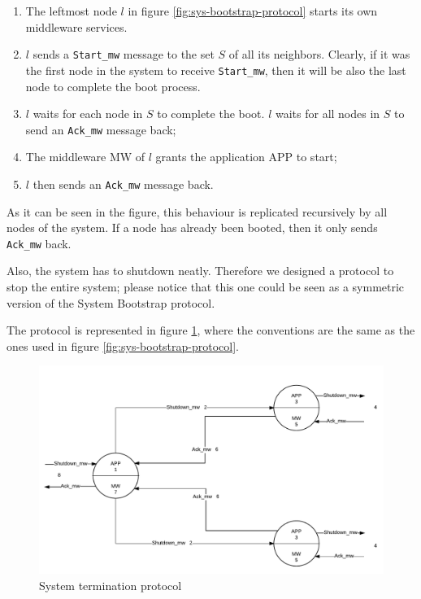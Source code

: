 \begin{enumerate}
  \item The leftmost node $l$ in figure \ref{fig:sys-bootstrap-protocol}
    starts its own middleware services.  
  \item $l$ sends a \texttt{Start\_mw} message to the set $S$ of all its
    neighbors. Clearly, if it was the first node in the system to receive
    \texttt{Start\_mw}, then it will be also the last node to complete the
    boot process.
  \item $l$ waits for each node in $S$ to complete the boot. $l$ waits for all
nodes in $S$ to send an \texttt{Ack\_mw} message back;
  \item The middleware MW of $l$ grants the application APP to start;
  \item $l$ then sends an \texttt{Ack\_mw} message back.
\end{enumerate}

As it can be seen in the figure, this behaviour is replicated recursively
by all nodes of the system. If a node has already been booted, then it only
sends \texttt{Ack\_mw} back.

Also, the system has to shutdown neatly. Therefore we designed a protocol to
stop the entire system; please notice that this one could be seen as a
symmetric version of the System Bootstrap protocol.

The protocol is represented in figure \ref{fig:sys-termination-protocol}, where
the conventions are the same as the ones used in figure
\ref{fig:sys-bootstrap-protocol}.

\begin{figure}[H]
  \centering
  \includegraphics[width=\columnwidth]{sections/images/solution/termination.pdf}
  \caption{System termination protocol}
  \label{fig:sys-termination-protocol}
\end{figure}

